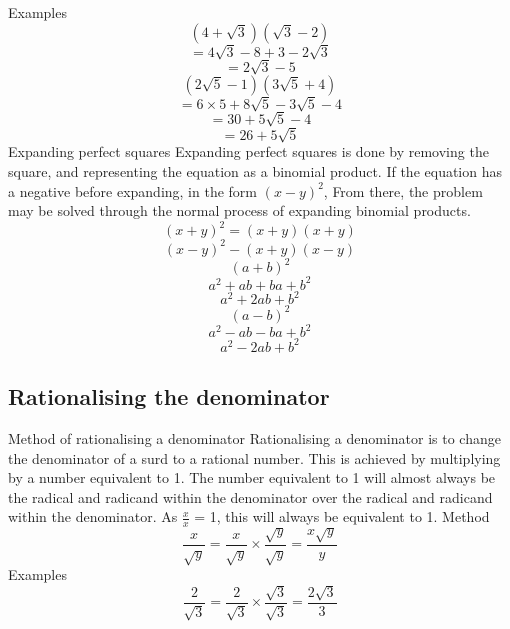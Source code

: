 \begin{outline}
			\3 Examples
				\[(4 + \sqrt{3})(\sqrt{3} - 2)\]
				\[= 4\sqrt{3} - 8 + 3 - 2\sqrt{3}\]
				\[= 2\sqrt{3} - 5\]
				\[\]
				\[(2\sqrt{5} - 1)(3\sqrt{5} + 4)\]
				\[= 6 \times 5 + 8\sqrt{5} - 3\sqrt{5} - 4\]
				\[= 30 + 5\sqrt{5} - 4\]
				\[= 26 + 5\sqrt{5}\]
	\1 Expanding perfect squares
		\2 Expanding perfect squares is done by removing the square, and representing the equation as a binomial product.  If the equation has a negative before expanding, in the form $(x - y)^2$, From there, the problem may be solved through the normal process of expanding binomial products.
			\[(x + y)^2 = (x + y)(x + y)\]
	 	 	\[(x - y)^2 -(x + y)(x - y)\]
 	 	 	\[\]
 	 	 	\[(a + b)^2\]
 	 	 	\[a^2 + ab + ba + b^2\]
	 	 	\[a^2 + 2ab + b^2\]
	 	 	\[\]
	 	 	\[(a - b)^2\]
	 	 	\[a^2 - ab - ba + b^2\]
	 	 	\[a^2 - 2ab + b^2\]

\0
\subsection{Rationalising the denominator}
	\1 Method of rationalising a denominator
		\2 Rationalising a denominator is to change the denominator of a surd to a rational number. This is achieved by multiplying by a number equivalent to 1. The number equivalent to 1 will almost always be the radical and radicand within the denominator over the radical and radicand within the denominator. As $\frac{x}{x}$ = 1, this will always be equivalent to 1.
			\3 Method
				\[\frac{x}{\sqrt{y}} = \frac{x}{\sqrt{y}} \times \frac{\sqrt{y}}{\sqrt{y}} = \frac{x\sqrt{y}}{y}\]
			\3 Examples
				\[\frac{2}{\sqrt{3}} = \frac{2}{\sqrt{3}} \times \frac{\sqrt{3}}{\sqrt{3}} = \frac{2\sqrt{3}}{3}\]

\0

\end{outline}
